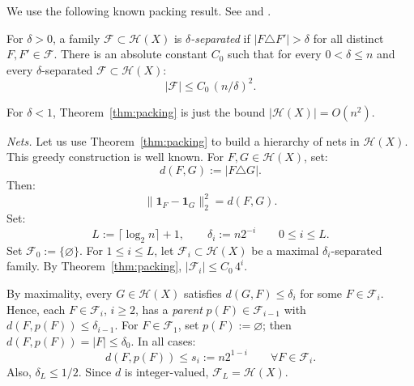 \documentclass[12pt,reqno]{amsart}
\numberwithin{equation}{section}
\newcommand{\one}{\mathbf{1}}
\begin{document}
We use the following known packing result. See \cite[\S\,5.3]{Mat} 
and \cite{ChazWelzl}.
\begin{theorem}\label{thm:packing}
For \(\delta>0\), a family \(\mathcal F\subset\mathcal H(X)\) is \emph{\(\delta\)-separated} if \(|F\triangle F'|>\delta\) for all distinct \(F,F'\in\mathcal F\). There is an absolute constant \(C_0\) such that for every \(0<\delta\le n\) and every \(\delta\)-separated \(\mathcal F\subset\mathcal H(X)\):
\[
|\mathcal F|\le C_0\,(n/\delta)^2.
\]
\end{theorem}
For \(\delta<1\), Theorem~\ref{thm:packing} is just the bound \(|\mathcal H(X)|=O(n^2)\).
\smallskip%

\emph{Nets.} Let us use Theorem~\ref{thm:packing} to build a hierarchy of nets in \(\mathcal H(X)\). This greedy construction is well 
known. For \(F,G\in\mathcal H(X)\), set:
\[
d(F,G):=|F\triangle G|.
\]
Then:
\[
\|\one_F-\one_G\|_2^2=d(F,G).
\]
Set:
\[
L:=\lceil\log_2n\rceil+1,\qquad
\delta_i:=n2^{-i}\qquad 0\le i\le L.
\]
Set \(\mathcal F_0:=\{\varnothing\}\). For \(1\le i\le L\), let \(\mathcal F_i\subset\mathcal H(X)\) be a maximal \(\delta_i\)-separated family. By Theorem~\ref{thm:packing}, \(|\mathcal F_i|\le C_0\,4^i\).
\smallskip%

By maximality, every \(G\in\mathcal H(X)\) satisfies \(d(G,F)\le\delta_i\) for some \(F\in\mathcal F_i\). Hence, each \(F\in\mathcal F_i\), \(i\ge2\), has a \emph{parent} \(p(F)\in\mathcal F_{i-1}\) with \(d(F,p(F))\le\delta_{i-1}\). For \(F\in\mathcal F_1\), set \(p(F):=\varnothing\); then \(d(F,p(F))=|F|\le\delta_0\). In all cases:
\[
d(F,p(F))\le s_i:=n2^{1-i}\qquad   \forall F\in\mathcal F_i.
\]
Also, \(\delta_L\le1/2\). Since 
\(d\) is integer-valued, \(\mathcal F_L=\mathcal H(X)\).
\smallskip%
\end{document}
